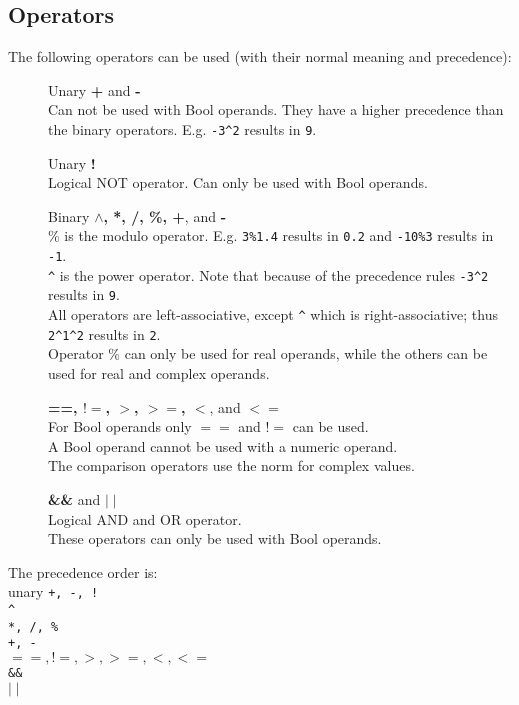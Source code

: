 \subsection{\label{LEL:OPERATORS}Operators}
The following operators can be used (with their normal meaning and
precedence):
\begin{description}
  \item[] Unary \textbf{+} and \textbf{-}
       \\Can not be used with Bool operands.
       They have a higher precedence than the binary operators.
       E.g. \texttt{-3}\verb+^+\texttt{2} results in \texttt{9}.
  \item[] Unary \textbf{!}
       \\Logical NOT operator.
       Can only be used with Bool operands.
  \item[] Binary \textbf{$\wedge$, *, /, \%, +}, and \textbf{-}
       \\\% is the modulo operator.
       E.g. \texttt{3\%1.4} results in \texttt{0.2} and
       \texttt{-10\%3} results in \texttt{-1}.
       \\\verb+^+ is the power operator.
       Note that because of the precedence rules
       \texttt{-3}\verb+^+\texttt{2} results in \texttt{9}.
       \\All operators are left-associative, except \verb+^+ which is
       right-associative; thus
       \texttt{2}\verb+^+\texttt{1}\verb+^+\texttt{2} results in \texttt{2}.
       \\Operator \% can only be used for real operands, while the others
       can be used for real and complex operands.
  \item[] \textbf{==, $!=$, $>$, $>=$, $<$}, and \textbf{$<=$}
       \\For Bool operands only $==$ and $!=$ can be used.
       \\A Bool operand cannot be used with a numeric operand.
       \\The comparison operators use the norm for complex values.
  \item[] \textbf{\&\&} and \textbf{$\mid\mid$}
       \\Logical AND and OR operator. 
       \\These operators can only be used with Bool operands.
\end{description}
\begin{description}
  \item The precedence order is:
       \\unary \texttt{+, -, !}
       \\\verb+^+
       \\\texttt{*, /, \%}
       \\\texttt{+, -}
       \\\texttt{$==, !=, >, >=, <, <=$}
       \\\texttt{\&\&}
       \\\texttt{$\mid\mid$}
\end{description}

